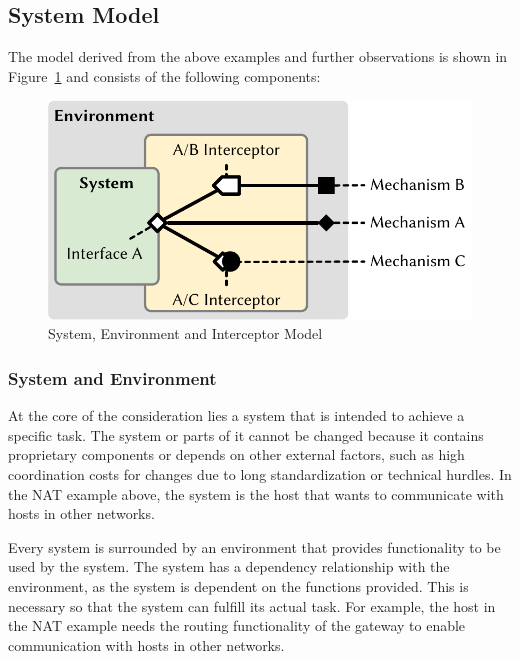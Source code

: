 \subsection{System Model}

The model derived from the above examples and further observations is shown in Figure~\ref{fig:model} and consists of the following components:
\begin{figure}
    \centering
    \includegraphics[width=.8\linewidth]{figures/model.pdf}
    \caption{System, Environment and Interceptor Model}
    \label{fig:model}
\end{figure}


\subsubsection{System and Environment}
At the core of the consideration lies a system that is intended to achieve a specific task.
The system or parts of it cannot be changed because it contains proprietary components or depends on other external factors, such as high coordination costs for changes due to long standardization or technical hurdles.
In the NAT example above, the system is the host that wants to communicate with hosts in other networks.

Every system is surrounded by an environment that provides functionality to be used by the system.
The system has a dependency relationship with the environment, as the system is dependent on the functions provided.
This is necessary so that the system can fulfill its actual task.
For example, the host in the NAT example needs the routing functionality of the gateway to enable communication with hosts in other networks.

